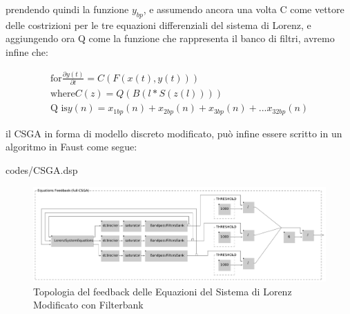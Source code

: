 prendendo quindi la funzione \( y_{bp} \), e assumendo ancora una volta C come vettore delle costrizioni
per le tre equazioni differenziali del sistema di Lorenz, 
e aggiungendo ora Q come la funzione che rappresenta il banco di filtri, 
avremo infine che:

\begin{gather*}
    \text{for} \frac{\partial y(t)}{\partial t} = C(F(x(t), y(t))) \\
    \text{where} C(z) = Q(B(l * S(z(l)))) \\
    \text{Q is} y(n) = x_{1bp}(n) + x_{2bp}(n) + x_{3bp}(n) + ... x_{32bp}(n)
\end{gather*}

il CSGA in forma di modello discreto modificato,
può infine essere scritto in un algoritmo in Faust come segue:

\vspace{0.5cm} 

{codes/CSGA.dsp}

\begin{figure}[h!]
\begin{center}
    \includegraphics[width=14cm]{figures/LorenzSystemFB3.pdf}
    \caption {Topologia del feedback delle Equazioni del Sistema di Lorenz Modificato con Filterbank}
\end{center}
\vspace{0.5cm}
\end{figure}

